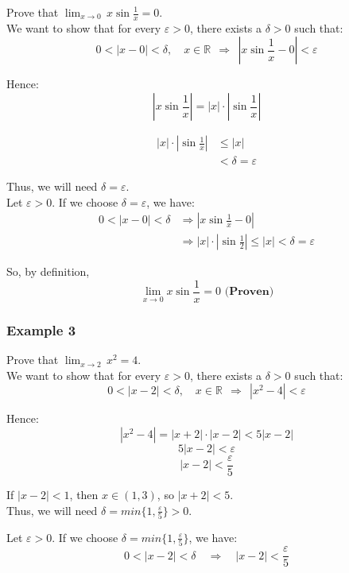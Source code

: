 \documentclass[11pt]{article}
\begin{document}
Prove that \(\lim_{x \rightarrow 0} \, x \sin \frac{1}{x} = 0\).
\\[0pt]

We want to show that for every \(\varepsilon > 0\), there exists a \(\delta > 0\) such that:
\[0 < |x - 0| < \delta, \quad x \in \mathbb{R} \ \ \Rightarrow \ \ \left|x \sin \frac{1}{x} - 0 \right| < \varepsilon\]

Hence:
\[|x \sin \frac{1}{x}| = |x| \cdot |\sin \frac{1}{x}|\]

\begin{align*}
|x| \cdot |\sin \frac{1}{x}| &\leq |x| \\
&< \delta = \varepsilon
\end{align*}

Thus, we will need \(\delta = \varepsilon\).
\\[0pt]

Let \(\varepsilon > 0\). If we choose \(\delta = \varepsilon\), we have:
\begin{align*}
0 < |x - 0| < \delta &\Rightarrow \left|x \sin \frac{1}{x} - 0 \right| \\
&\Rightarrow |x| \cdot \left|\sin \frac{1}{2} \right| \leq |x| < \delta = \varepsilon
\end{align*}

So, by definition,
\[\lim_{x \rightarrow 0} x \sin \frac{1}{x} = 0 \textbf{ (Proven)}\]

\newpage

\subsubsection{Example 3}
\label{sec:org22b7e97}
Prove that \(\lim_{x \rightarrow 2} \, x^2 = 4\).
\\[0pt]

We want to show that for every \(\varepsilon > 0\), there exists a \(\delta > 0\) such that:
\[0 < |x - 2| < \delta, \quad x \in \mathbb{R} \ \ \Rightarrow \ \ |x^2 - 4| < \varepsilon\]

Hence:
\[|x^2 - 4| = |x + 2| \cdot | x - 2| < 5|x - 2|\]
\[5|x - 2| < \varepsilon\]
\[|x - 2| < \frac{\varepsilon}{5}\]

If \(|x - 2| < 1\), then \(x \in (1,3)\), so \(|x + 2| < 5\).
\\[0pt]

Thus, we will need \(\delta = min\{1, \frac{\varepsilon}{5}\} > 0\).

Let \(\varepsilon > 0\). If we choose \(\delta = min\{1, \frac{\varepsilon}{5}\}\), we have:
\[0 < |x - 2| < \delta \quad \Rightarrow \quad |x - 2| < \frac{\varepsilon}{5}\]
\end{document}
